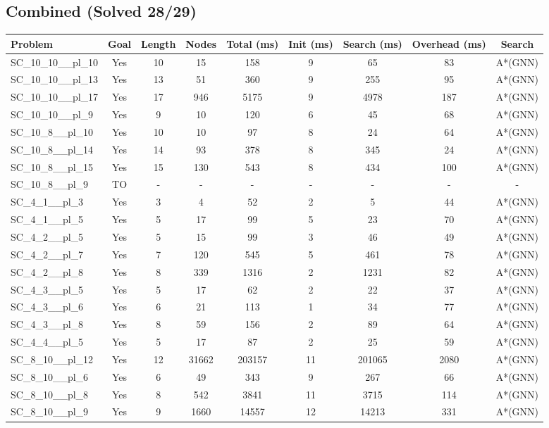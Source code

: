 \documentclass{article}
\begin{document}
\subsection*{Combined (Solved 28/29)}
\begin{tabular}{lcccccccc}
\toprule
Problem & Goal & Length & Nodes & Total (ms) & Init (ms) & Search (ms) & Overhead (ms) & Search \\
\midrule
SC\_10\_10\_\_pl\_10 & Yes & 10 & 15 & 158 & 9 & 65 & 83 & A*(GNN) \\
SC\_10\_10\_\_pl\_13 & Yes & 13 & 51 & 360 & 9 & 255 & 95 & A*(GNN) \\
SC\_10\_10\_\_pl\_17 & Yes & 17 & 946 & 5175 & 9 & 4978 & 187 & A*(GNN) \\
SC\_10\_10\_\_pl\_9 & Yes & 9 & 10 & 120 & 6 & 45 & 68 & A*(GNN) \\
SC\_10\_8\_\_pl\_10 & Yes & 10 & 10 & 97 & 8 & 24 & 64 & A*(GNN) \\
SC\_10\_8\_\_pl\_14 & Yes & 14 & 93 & 378 & 8 & 345 & 24 & A*(GNN) \\
SC\_10\_8\_\_pl\_15 & Yes & 15 & 130 & 543 & 8 & 434 & 100 & A*(GNN) \\
SC\_10\_8\_\_pl\_9 & TO & - & - & - & - & - & - & - \\
SC\_4\_1\_\_pl\_3 & Yes & 3 & 4 & 52 & 2 & 5 & 44 & A*(GNN) \\
SC\_4\_1\_\_pl\_5 & Yes & 5 & 17 & 99 & 5 & 23 & 70 & A*(GNN) \\
SC\_4\_2\_\_pl\_5 & Yes & 5 & 15 & 99 & 3 & 46 & 49 & A*(GNN) \\
SC\_4\_2\_\_pl\_7 & Yes & 7 & 120 & 545 & 5 & 461 & 78 & A*(GNN) \\
SC\_4\_2\_\_pl\_8 & Yes & 8 & 339 & 1316 & 2 & 1231 & 82 & A*(GNN) \\
SC\_4\_3\_\_pl\_5 & Yes & 5 & 17 & 62 & 2 & 22 & 37 & A*(GNN) \\
SC\_4\_3\_\_pl\_6 & Yes & 6 & 21 & 113 & 1 & 34 & 77 & A*(GNN) \\
SC\_4\_3\_\_pl\_8 & Yes & 8 & 59 & 156 & 2 & 89 & 64 & A*(GNN) \\
SC\_4\_4\_\_pl\_5 & Yes & 5 & 17 & 87 & 2 & 25 & 59 & A*(GNN) \\
SC\_8\_10\_\_pl\_12 & Yes & 12 & 31662 & 203157 & 11 & 201065 & 2080 & A*(GNN) \\
SC\_8\_10\_\_pl\_6 & Yes & 6 & 49 & 343 & 9 & 267 & 66 & A*(GNN) \\
SC\_8\_10\_\_pl\_8 & Yes & 8 & 542 & 3841 & 11 & 3715 & 114 & A*(GNN) \\
SC\_8\_10\_\_pl\_9 & Yes & 9 & 1660 & 14557 & 12 & 14213 & 331 & A*(GNN) \\

\end{tabular}
\end{document}

